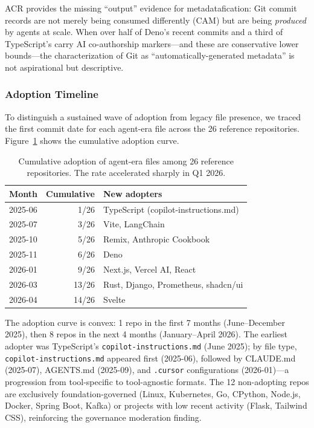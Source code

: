 \documentclass[12pt]{article}
\begin{document}
ACR provides the missing ``output'' evidence for metadatafication: Git commit records are not merely being consumed differently (CAM) but are being \textit{produced} by agents at scale. When over half of Deno's recent commits and a third of TypeScript's carry AI co-authorship markers---and these are conservative lower bounds---the characterization of Git as ``automatically-generated metadata'' is not aspirational but descriptive.

\subsubsection{Adoption Timeline}

To distinguish a sustained wave of adoption from legacy file presence, we traced the first commit date for each agent-era file across the 26 reference repositories. Figure~\ref{tab:adoption} shows the cumulative adoption curve.

\begin{table}[ht]
\centering
\small
\begin{tabularx}{\textwidth}{lrl}
\toprule
\textbf{Month} & \textbf{Cumulative} & \textbf{New adopters} \\
\midrule
2025-06 & 1/26 & TypeScript (copilot-instructions.md) \\
2025-07 & 3/26 & Vite, LangChain \\
2025-10 & 5/26 & Remix, Anthropic Cookbook \\
2025-11 & 6/26 & Deno \\
2026-01 & 9/26 & Next.js, Vercel AI, React \\
2026-03 & 13/26 & Rust, Django, Prometheus, shadcn/ui \\
2026-04 & 14/26 & Svelte \\
\bottomrule
\end{tabularx}
\caption{Cumulative adoption of agent-era files among 26 reference repositories. The rate accelerated sharply in Q1 2026.}
\label{tab:adoption}
\end{table}

The adoption curve is convex: 1 repo in the first 7 months (June--December 2025), then 8 repos in the next 4 months (January--April 2026). The earliest adopter was TypeScript's \texttt{copilot-instructions.md} (June 2025); by file type, \texttt{copilot-instructions.md} appeared first (2025-06), followed by CLAUDE.md (2025-07), AGENTS.md (2025-09), and \texttt{.cursor} configurations (2026-01)---a progression from tool-specific to tool-agnostic formats. The 12 non-adopting repos are exclusively foundation-governed (Linux, Kubernetes, Go, CPython, Node.js, Docker, Spring Boot, Kafka) or projects with low recent activity (Flask, Tailwind CSS), reinforcing the governance moderation finding.
\end{document}
